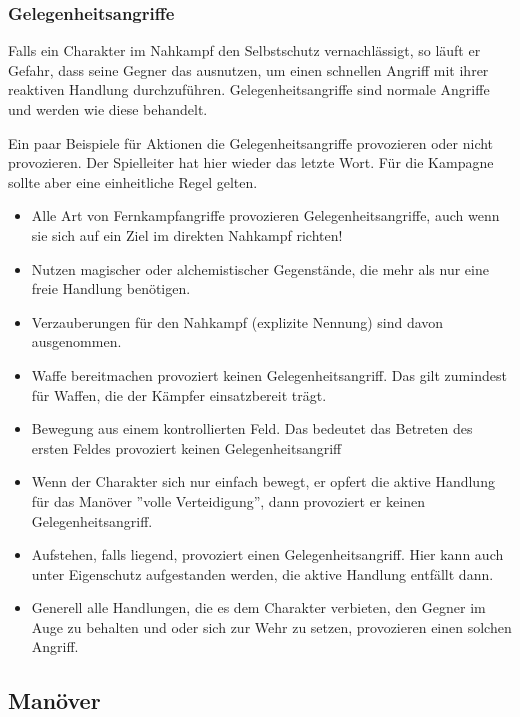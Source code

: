 \documentclass{article}
\begin{document}
\subsubsection{Gelegenheitsangriffe}

Falls ein Charakter im Nahkampf den Selbstschutz vernachlässigt, so läuft er Gefahr, dass seine Gegner das ausnutzen,
um einen schnellen Angriff mit ihrer reaktiven Handlung durchzuführen. Gelegenheitsangriffe sind normale Angriffe und
werden wie diese behandelt.

Ein paar Beispiele für Aktionen die Gelegenheitsangriffe provozieren oder nicht provozieren. Der Spielleiter hat hier
wieder das letzte Wort. Für die Kampagne sollte aber eine einheitliche Regel gelten.

\begin{itemize}
\item Alle Art von Fernkampfangriffe provozieren Gelegenheitsangriffe, auch wenn sie sich auf ein Ziel im direkten Nahkampf richten!
\item Nutzen magischer oder alchemistischer Gegenstände, die mehr als nur eine freie Handlung benötigen.
\item Verzauberungen für den Nahkampf (explizite Nennung) sind davon ausgenommen.
\item Waffe bereitmachen provoziert keinen Gelegenheitsangriff. Das gilt zumindest für Waffen, die der Kämpfer einsatzbereit trägt.
\item Bewegung aus einem kontrollierten Feld. Das bedeutet das Betreten des ersten Feldes provoziert keinen Gelegenheitsangriff
\item Wenn der Charakter sich nur einfach bewegt, er opfert die aktive Handlung für das Manöver ''volle Verteidigung'', dann provoziert er keinen Gelegenheitsangriff.
\item Aufstehen, falls liegend, provoziert einen Gelegenheitsangriff. Hier kann auch unter Eigenschutz aufgestanden werden, die aktive Handlung entfällt dann.
\item Generell alle Handlungen, die es dem Charakter verbieten, den Gegner im Auge zu behalten und oder sich zur Wehr zu setzen, provozieren einen solchen Angriff.
\end{itemize}

\begin{center}
\subsection{Manöver}
\end{center}
\end{document}
